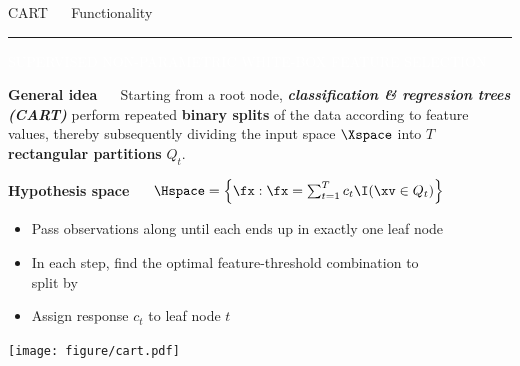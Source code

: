 \documentclass[11pt,compress,t,notes=noshow, xcolor=table]{beamer}
\begin{document}

\LARGE
\begin{frame}{\textcolor{gray!80}{CART} ~~ Functionality}
\normalsize
\vspace{-0.5cm}
\noindent \textcolor{gray!80}{\rule{\textwidth}{1pt}}

\vspace{0.3cm}

\footnotesize

\colorbox{gray!80}{\textcolor{white}{SUPERVISED}} 
\colorbox{gray!80}{\textcolor{white}{NON-PARAMETRIC}} 
\colorbox{gray!80}{\textcolor{white}{WHITE-BOX}} 
\colorbox{gray!80}{\textcolor{white}{FEATURE SELECTION}}

\medskip

\textbf{\textcolor{gray!80}{General idea}} ~~ Starting from a root node, 
\textit{\textbf{classification \& regression trees (CART)}} 
perform repeated \textbf{binary splits} of the data according to feature values, 
thereby subsequently dividing the input space $\Xspace$ into $T$ 
\textbf{rectangular partitions} $Q_t$.

\medskip
 
\textbf{\textcolor{gray!80}{Hypothesis space}} ~~
$\Hspace = \left\{ \fx: \fx = \sum_{t = 1}^T c_t \I(\xv \in Q_t) 
\right\}$

\medskip

\begin{minipage}{0.6\textwidth}
  \begin{itemize}
    \item Pass observations along until each ends up in exactly 
    one leaf node
    \item In each step, find the optimal feature-threshold
    combination to \\ split by
  \item Assign response $c_t$ to leaf node $t$
\end{itemize}

\end{minipage}%
\begin{minipage}{0.4\textwidth}
  \texttt{[image: figure/cart.pdf]}
\end{minipage}

\end{frame}

\end{document}
